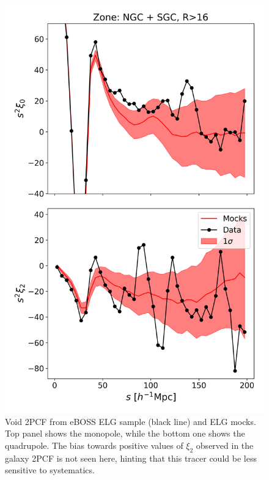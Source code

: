 \documentclass[fleqn, usenatbib]{mnras}
\begin{document}
\begin{figure}
	\centering
	\includegraphics[width=1\linewidth]{plots/void_CBZ}
	\caption{Void 2PCF from eBOSS ELG sample (black line) and ELG mocks. Top panel shows the monopole, while the bottom one shows the quadrupole. The bias towards positive values of $\xi_2$ observed in the galaxy 2PCF is not seen here, hinting that this tracer could be less sensitive to systematics.}
	\label{fig:voidcbz}
\end{figure}
\end{document}
